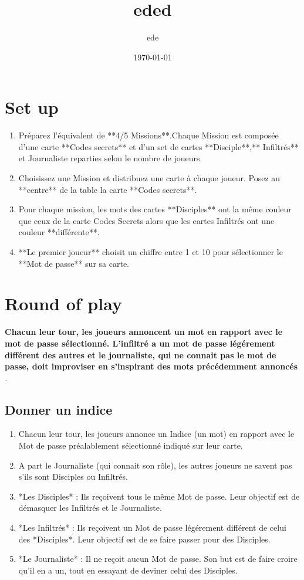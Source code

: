\documentclass{article}%
\title{eded}%
\author{ede}%
\date{\today}%
\begin{document}
%
\pagestyle{empty}%
\normalsize%
\maketitle%
\section{ Set up
}%
\label{sec:Setup}%
\begin{enumerate}%
\item%
 Préparez l'équivalent de **4/5 Missions**.Chaque Mission est composée d'une carte **Codes secrets** et d'un set de cartes **Disciple**,** Infiltrés** et Journaliste reparties selon le nombre de joueurs.
%
\item%
 Choisissez une Mission et distribuez une carte à chaque joueur. Posez au **centre** de la table la carte **Codes secrets**.
%
\item%
 Pour chaque mission, les mots des cartes **Disciples** ont la même couleur que ceux de la carte Codes Secrets alors que les cartes Infiltrés ont une couleur **différente**.
%
\item%
 **Le premier joueur** choisit un chiffre entre 1 et 10 pour sélectionner le **Mot de passe** sur sa carte.
%
\end{enumerate}

%
\section{ Round of play
}%
\label{sec:Roundofplay}%
\textbf{Chacun leur tour, les joueurs annoncent un mot en rapport avec le mot de passe sélectionné. L'infiltré a un mot de passe légérement différent des autres et le journaliste, qui ne connait pas le mot de passe, doit improviser en s'inspirant des mots précédemment annoncés}%
\textit{.
}

%
\subsection{ Donner un indice
}%
\label{subsec:Donnerunindice}%
\begin{enumerate}%
\item%
 Chacun leur tour, les joueurs annonce un Indice (un mot) en rapport avec le Mot de passe préalablement sélectionné indiqué sur leur carte.
%
\item%
 A part le Journaliste (qui connait son rôle), les autres joueurs ne savent pas s'ils sont Disciples ou Infiltrés.
%
\item%
 *Les Disciples* : Ils reçoivent tous le même Mot de passe. Leur objectif est de démasquer les Infiltrés et le Journaliste.
%
\item%
 *Les Infiltrés* : Ils reçoivent un Mot de passe légérement différent de celui des *Disciples*. Leur objectif est de se faire passer pour des Disciples.
%
\item%
 *Le Journaliste* : Il ne reçoit aucun Mot de passe. Son but est de faire croire qu'il en a un, tout en essayant de deviner celui des Disciples.
%
\end{enumerate}
\end{document}
